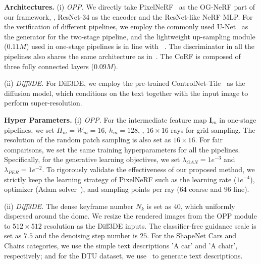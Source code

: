\noindent\textbf{Architectures.}
(i) \textit{OPP.} We directly take PixelNeRF~\cite{PixelNeRF_yu2021pixelnerf} as the OG-NeRF part of our framework, \ie, ResNet-34 as the encoder and the ResNet-like NeRF MLP. For the verification of different pipelines,  
we employ the commonly used U-Net~\cite{Unet_ronneberger2015u} as the generator for the two-stage pipeline, and the lightweight up-sampling module ($0.11 M$) used in one-stage pipelines is in line with ~\cite{GIRAFFE_niemeyer2021giraffe}.
The discriminator in all the pipelines also shares the same architecture as in~\cite{GIRAFFE_niemeyer2021giraffe}. The CoRF is composed of three fully connected layers ($0.09M$). 

(ii) \textit{Diff3DE.} For Diff3DE, we employ the pre-trained ControlNet-Tile~\cite{zhang2023addingControlNet} as the diffusion model, which conditions on the text together with the input image to perform super-resolution.  


%  



\vspace{0.1cm}
\noindent\textbf{Hyper Parameters.}
(i) \textit{OPP.} For the intermediate feature map $\textbf{I}_m$ in one-stage pipelines, we set $H_m=W_m=16$, $h_m=128$, \ie, $16\times16$ rays for grid sampling. The resolution of the random patch sampling is also set as $16\times16$. 
For fair comparisons, we set the same training hyperparameters for all the pipelines. Specifically, for the generative learning objectives, we set $\lambda_{GAN}=1e^{-3}$ and $\lambda_{PER}=1e^{-2}$. To rigorously validate the effectiveness of our proposed method, we strictly keep the learning strategy of PixelNeRF such as the learning rate ($1e^{-4}$), optimizer (Adam solver~\cite{Adam_kingma2014adam}), and sampling points per ray ($64$ coarse and $96$ fine). 


(ii) \textit{Diff3DE.} The dense keyframe number $N_k$ is set as $40$, which uniformly dispersed around the dome. 
We resize the rendered images from the OPP module to $512\times512$ resolution as the Diff3DE inputs. The classifier-free guidance scale is set as $7.5$ and the denoising step number is $25$. 
For the ShapeNet Cars and Chairs categories, we use the simple text descriptions 'A car' and 'A chair', respectively; and for the DTU dataset, we use~\cite{li2023blip2}  to generate text descriptions.




